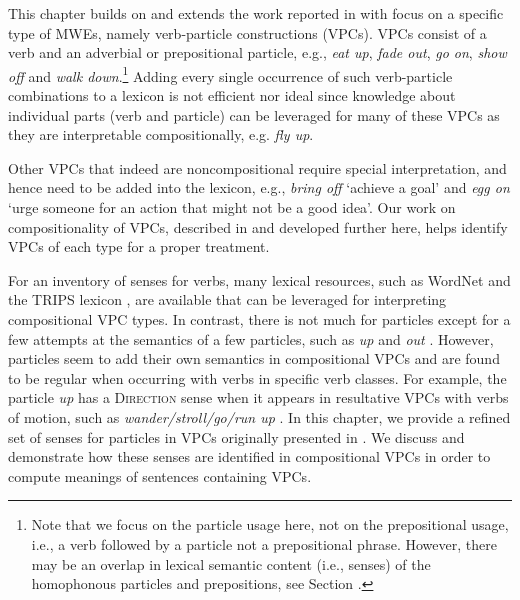 \documentclass[output=paper
,modfonts
,nonflat]{langsci/langscibook}
\begin{document}
This chapter builds on and extends the work reported in \citet{Bha17} with focus on a specific type of MWEs, namely verb-particle constructions (VPCs). VPCs consist of a verb and an adverbial or prepositional particle, e.g., \textit{eat up}, \textit{fade out}, \textit{go on}, \textit{show off} and \textit{walk down}.\footnote{Note that we focus on the particle usage here, not on the prepositional usage, i.e., a verb followed by a particle not a prepositional phrase. However, there may be an overlap in lexical semantic content (i.e., senses) of the homophonous particles and prepositions, see Section .} Adding every single occurrence of such verb-particle combinations to a lexicon is not efficient nor ideal since knowledge about individual parts (verb and particle) can be leveraged for many of these VPCs as they are interpretable compositionally, e.g. \textit{fly up}. 

Other VPCs that indeed are noncompositional require special interpretation, and hence need to be added into the lexicon, e.g., \textit{bring off} `achieve a goal' and \textit{egg on} `urge someone for an action that might not be a good idea'. Our work on compositionality of VPCs, described in \citet{Bha17} and developed further here, helps identify VPCs of each type for a proper treatment.

For an inventory of senses for verbs, many lexical resources, such as WordNet \citep{Mil95,Fel98} and the TRIPS lexicon \citep{All17}, are available that can be leveraged for interpreting compositional VPC types. In contrast, there is not much for particles except for a few attempts at the semantics of a few particles, such as \textit{up} \citep{Coo06} and \textit{out} \citep{Tyl03}. However, particles seem to add their own semantics in compositional VPCs and are found to be regular when occurring with verbs in specific verb classes. For example, the particle \textit{up} has a \textsc{Direction} sense when it appears in resultative VPCs with verbs of motion, such as \textit{wander/stroll/go/run up} \citep{Vil06}. In this chapter, we provide a refined set of senses for particles in VPCs originally presented in \citet{Bha17}. We discuss and demonstrate how these senses are identified in compositional VPCs in order to compute meanings of sentences containing VPCs. 
\end{document}
